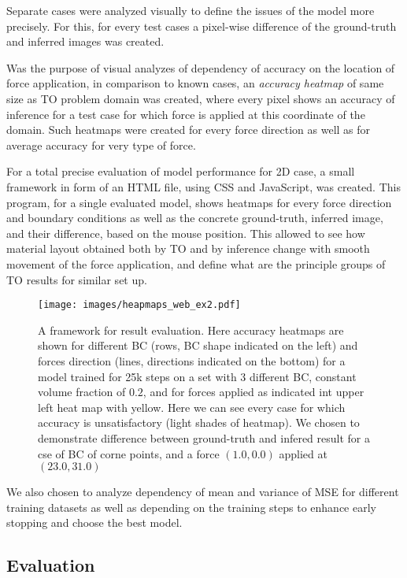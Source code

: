 Separate cases were analyzed visually to define the issues of the model more precisely.
For this, for  every test cases a pixel-wise difference of the ground-truth and inferred images was created.

Was the purpose of visual analyzes of dependency of accuracy on the location of force application, in comparison to known cases, an \textit{accuracy heatmap} of same size as TO problem domain was created, where every pixel shows an accuracy of inference for a test case for which force is applied at this coordinate of the domain. 
Such heatmaps were created for every force direction as well as for average accuracy for very type of force.

For a total precise evaluation of model performance for 2D case, a small framework in form of an HTML file, using CSS and JavaScript, was created.
This program, for a single evaluated model, shows heatmaps for every force direction and boundary conditions as well as the concrete ground-truth, inferred image, and their difference, based on the mouse position.
This allowed to see how material layout obtained both by TO and by inference change with smooth movement of the force application, and define what are the principle groups of TO results for similar set up.
\begin{figure}[]
	\centering
	\texttt{[image: images/heapmaps\_web\_ex2.pdf]}
	\caption{A framework for result evaluation. Here accuracy heatmaps are shown for different BC (rows, BC shape indicated on the left) and forces direction (lines, directions indicated on the bottom) for a model trained for 25k steps on a set with 3 different BC, constant volume fraction of $0.2$, and for forces applied as indicated int upper left heat map with yellow. Here we can see every case for which accuracy is unsatisfactory (light shades of heatmap). We chosen to demonstrate difference between ground-truth and infered result for a cse of BC of corne points, and a force $(1.0,0.0)$ applied at $(23.0,31.0)$ }
	\label{fig:to_flow}
\end{figure}

We also chosen to analyze dependency of mean and variance of MSE for different training datasets as well as depending on the training steps to enhance early stopping and choose the best model.

\subsection{Evaluation}

